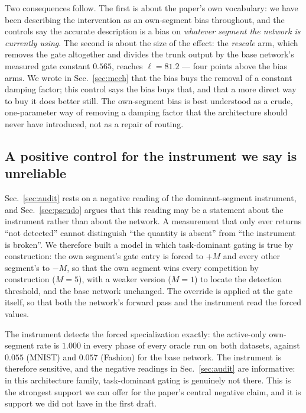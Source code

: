 \documentclass[review,12pt,number]{elsarticle}
\begin{document}
Two consequences follow. The first is about the paper's own vocabulary:
we have been describing the intervention as an own-segment bias
throughout, and the controls say the accurate description is a bias on
\emph{whatever segment the network is currently using}. The second is
about the size of the effect: the \emph{rescale} arm, which removes the
gate altogether and divides the trunk output by the base network's
measured gate constant $0.565$, reaches $\ell=81.2$ --- four points
above the bias arms. We wrote in Sec.~\ref{sec:mech} that the bias buys
the removal of a constant damping factor; this control says the bias
buys that, and that a more direct way to buy it does better still. The
own-segment bias is best understood as a crude, one-parameter way of
removing a damping factor that the architecture should never have
introduced, not as a repair of routing.

\subsection{A positive control for the instrument we say is unreliable}
\label{sec:ctrl-oracle}

Sec.~\ref{sec:audit} rests on a negative reading of the dominant-segment
instrument, and Sec.~\ref{sec:pseudo} argues that this reading may be a
statement about the instrument rather than about the network. A
measurement that only ever returns ``not detected'' cannot distinguish
``the quantity is absent'' from ``the instrument is broken''. We therefore
built a model in which task-dominant gating is true by construction: the
own segment's gate entry is forced to $+M$ and every other segment's to
$-M$, so that the own segment wins every competition by construction
($M=5$), with a weaker version ($M=1$) to locate the detection
threshold, and the base network unchanged. The override is applied at
the gate itself, so that both the network's forward pass and the
instrument read the forced values.

The instrument detects the forced specialization exactly: the
active-only own-segment rate is $1.000$ in every phase of every oracle
run on both datasets, against $0.055$ (MNIST) and $0.057$ (Fashion) for
the base network. The instrument is therefore sensitive, and the negative
readings in Sec.~\ref{sec:audit} are informative: in this architecture
family, task-dominant gating is genuinely not there. This is the
strongest support we can offer for the paper's central negative claim,
and it is support we did not have in the first draft.
\end{document}
